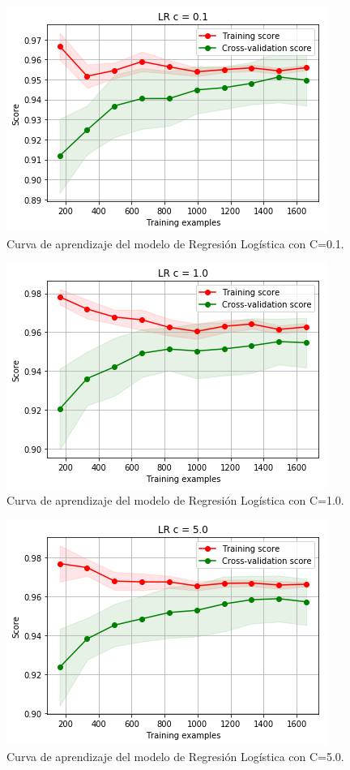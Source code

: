 \documentclass[11pt,a4paper]{article}
\begin{document}
\begin{figure}[H]
    \centering
    \includegraphics[scale=0.7]{img/lc-lr-c-01.png}
    \caption{Curva de aprendizaje del modelo de Regresión Logística con C=0.1.}
    \label{fig:lc-lr-c-01}
\end{figure}

\begin{figure}[H]
    \centering
    \includegraphics[scale=0.7]{img/lc-lr-c-1.png}
    \caption{Curva de aprendizaje del modelo de Regresión Logística con C=1.0.}
    \label{fig:lc-lr-c-1}
\end{figure}

\begin{figure}[H]
    \centering
    \includegraphics[scale=0.7]{img/lc-lr-c-5.png}
    \caption{Curva de aprendizaje del modelo de Regresión Logística con C=5.0.}
    \label{fig:lc-lr-c-5}
\end{figure}
\end{document}
